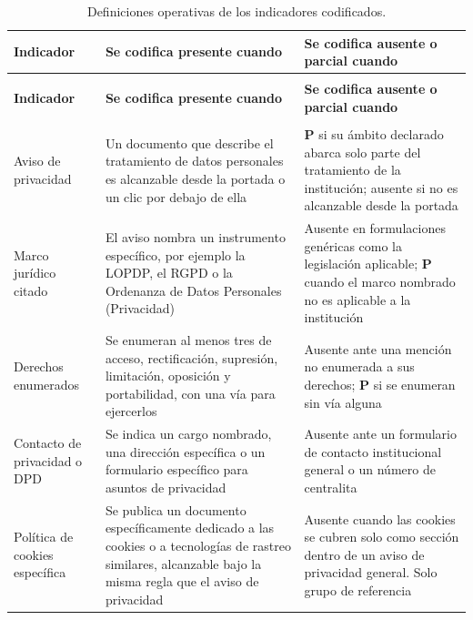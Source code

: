 \documentclass[pdflatex,sn-basic,Numbered,iicol]{sn-jnl}
\theoremstyle{thmstyleone}
\theoremstyle{thmstyletwo}
\theoremstyle{thmstylethree}
\begin{document}
\begin{appendices}
\footnotesize
\begin{longtable}{@{}>{\RaggedRight}p{2.7cm}>{\RaggedRight}p{4.75cm}>{\RaggedRight\arraybackslash}p{4.55cm}@{}}
	\caption{Definiciones operativas de los indicadores codificados.}\label{tab:codebook}\\
	\toprule
	\textbf{Indicador} & \textbf{Se codifica presente cuando} & \textbf{Se codifica ausente o parcial cuando} \\
	\midrule
	\endfirsthead
	\multicolumn{3}{c}{\textit{(Tabla~\ref{tab:codebook}, continuaci\'on)}}\\
	\toprule
	\textbf{Indicador} & \textbf{Se codifica presente cuando} & \textbf{Se codifica ausente o parcial cuando} \\
	\midrule
	\endhead
	\midrule
	\multicolumn{3}{r}{\textit{Contin\'ua en la p\'agina siguiente}}\\
	\endfoot
	\bottomrule
	\endlastfoot
	Aviso de privacidad & Un documento que describe el tratamiento de datos personales es alcanzable desde la portada o un clic por debajo de ella & \textbf{P} si su \'ambito declarado abarca solo parte del tratamiento de la instituci\'on; ausente si no es alcanzable desde la portada \\
	\addlinespace
	Marco jur\'idico citado & El aviso nombra un instrumento espec\'ifico, por ejemplo la LOPDP, el RGPD o la Ordenanza de Datos Personales (Privacidad) & Ausente en formulaciones gen\'ericas como \guillemotleft la legislaci\'on aplicable\guillemotright; \textbf{P} cuando el marco nombrado no es aplicable a la instituci\'on \\
	\addlinespace
	Derechos enumerados & Se enumeran al menos tres de acceso, rectificaci\'on, supresi\'on, limitaci\'on, oposici\'on y portabilidad, con una v\'ia para ejercerlos & Ausente ante una menci\'on no enumerada a \guillemotleft sus derechos\guillemotright; \textbf{P} si se enumeran sin v\'ia alguna \\
	\addlinespace
	Contacto de privacidad o DPD & Se indica un cargo nombrado, una direcci\'on espec\'ifica o un formulario espec\'ifico para asuntos de privacidad & Ausente ante un formulario de contacto institucional general o un n\'umero de centralita \\
	\addlinespace
	Pol\'itica de cookies espec\'ifica & Se publica un documento espec\'ificamente dedicado a las cookies o a tecnolog\'ias de rastreo similares, alcanzable bajo la misma regla que el aviso de privacidad & Ausente cuando las cookies se cubren solo como secci\'on dentro de un aviso de privacidad general. Solo grupo de referencia \\

\end{longtable}
\end{appendices}
\end{document}
